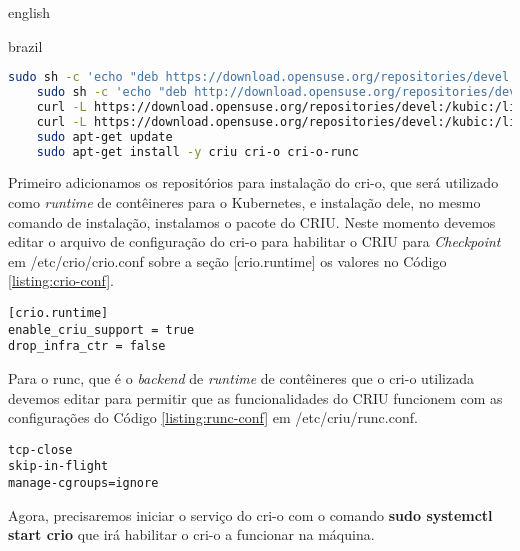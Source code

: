 \begin{otherlanguage*}{english}
\begin{otherlanguage*}{brazil}
\begin{lstlisting}[language=bash,caption={Comandos de configuração da máquina para CRIU e cri-o.},label={listing:setup-script}]
   sudo sh -c 'echo "deb https://download.opensuse.org/repositories/devel:/kubic:/libcontainers:/stable/xUbuntu_20.04/ /" > /etc/apt/sources.list.d/devel:kubic:libcontainers:stable.list'
	sudo sh -c 'echo "deb http://download.opensuse.org/repositories/devel:/kubic:/libcontainers:/stable:/cri-o:/1.25/xUbuntu_20.04/ /" > /etc/apt/sources.list.d/devel:kubic:libcontainers:stable:cri-o:$CRIO_VERSION.list'
	curl -L https://download.opensuse.org/repositories/devel:/kubic:/libcontainers:/stable:/cri-o:/1.25/xUbuntu_20.04/Release.key | sudo apt-key add -
	curl -L https://download.opensuse.org/repositories/devel:/kubic:/libcontainers:/stable/xUbuntu_20.04/Release.key | sudo apt-key add -
	sudo apt-get update
	sudo apt-get install -y criu cri-o cri-o-runc
\end{lstlisting}

Primeiro adicionamos os repositórios para instalação do cri-o, que será utilizado como
\textit{runtime} de contêineres para o Kubernetes, e instalação dele, no mesmo comando
de instalação, instalamos o pacote do CRIU. Neste momento devemos editar o arquivo de
configuração do cri-o para habilitar o CRIU para \textit{Checkpoint} em /etc/crio/crio.conf
sobre a seção [crio.runtime] os valores no Código \ref{listing:crio-conf}.

\begin{lstlisting}[language=plaintext,caption={Configuração a ser incluída no arquivo de configurações do cri-o.},label={listing:crio-conf}]
[crio.runtime]
enable_criu_support = true
drop_infra_ctr = false
\end{lstlisting}

Para o runc, que é o \textit{backend} de \textit{runtime} de contêineres que o cri-o
utilizada devemos editar para permitir que as funcionalidades do CRIU funcionem com as
configurações do Código \ref{listing:runc-conf} em /etc/criu/runc.conf.

\begin{lstlisting}[language=plaintext,caption={Configuração a ser incluída no arquivo de configurações do runc para o CRIU.},label={listing:runc-conf}]
tcp-close
skip-in-flight
manage-cgroups=ignore
\end{lstlisting}

Agora, precisaremos iniciar o serviço do cri-o com o comando \textbf{sudo systemctl start crio}
que irá habilitar o cri-o a funcionar na máquina.


\end{otherlanguage*}
\end{otherlanguage*}
